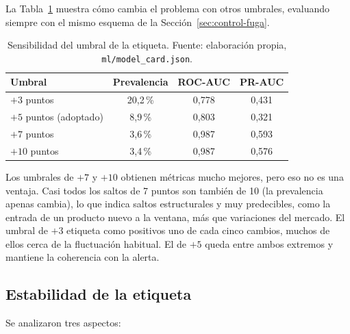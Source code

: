La Tabla~\ref{tab:sensibilidad-umbral} muestra cómo cambia el problema con otros umbrales, evaluando siempre con el mismo esquema de la Sección~\ref{sec:control-fuga}.

\begin{table}[H]
	\centering
	\small
	\caption{Sensibilidad del umbral de la etiqueta. Fuente: elaboración propia, \texttt{ml/model\_card.json}.}
	\label{tab:sensibilidad-umbral}
	\begin{tabular}{@{}lccc@{}}
		\toprule
		\textbf{Umbral} & \textbf{Prevalencia} & \textbf{ROC-AUC} & \textbf{PR-AUC} \\
		\midrule
		$+3$ puntos & 20,2\,\% & 0,778 & 0,431 \\
		$+5$ puntos (adoptado) & 8,9\,\% & 0,803 & 0,321 \\
		$+7$ puntos & 3,6\,\% & 0,987 & 0,593 \\
		$+10$ puntos & 3,4\,\% & 0,987 & 0,576 \\
		\bottomrule
	\end{tabular}
\end{table}

Los umbrales de $+7$ y $+10$ obtienen métricas mucho mejores, pero eso no es una ventaja. Casi todos los saltos de 7 puntos son también de 10 (la prevalencia apenas cambia), lo que indica saltos estructurales y muy predecibles, como la entrada de un producto nuevo a la ventana, más que variaciones del mercado. El umbral de $+3$ etiqueta como positivos uno de cada cinco cambios, muchos de ellos cerca de la fluctuación habitual. El de $+5$ queda entre ambos extremos y mantiene la coherencia con la alerta.

\subsection*{Estabilidad de la etiqueta}

Se analizaron tres aspectos:

